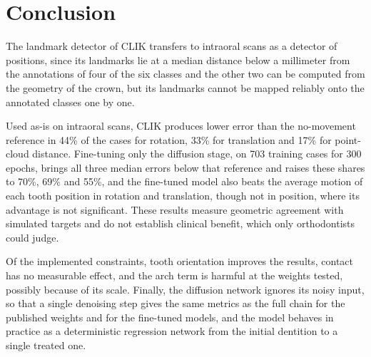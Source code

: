 \documentclass[10pt,a4paper]{article}
\begin{document}
\section{Conclusion}

The landmark detector of CLIK transfers to intraoral scans as a detector of positions, since its landmarks lie at a median distance below a millimeter from the annotations of four of the six classes and the other two can be computed from the geometry of the crown, but its landmarks cannot be mapped reliably onto the annotated classes one by one.

Used as-is on intraoral scans, CLIK produces lower error than the no-movement reference in 44\% of the cases for rotation, 33\% for translation and 17\% for point-cloud distance. Fine-tuning only the diffusion stage, on 703 training cases for 300 epochs, brings all three median errors below that reference and raises these shares to 70\%, 69\% and 55\%, and the fine-tuned model also beats the average motion of each tooth position in rotation and translation, though not in position, where its advantage is not significant. These results measure geometric agreement with simulated targets and do not establish clinical benefit, which only orthodontists could judge.

Of the implemented constraints, tooth orientation improves the results, contact has no measurable effect, and the arch term is harmful at the weights tested, possibly because of its scale. Finally, the diffusion network ignores its noisy input, so that a single denoising step gives the same metrics as the full chain for the published weights and for the fine-tuned models, and the model behaves in practice as a deterministic regression network from the initial dentition to a single treated one.




\end{document}
